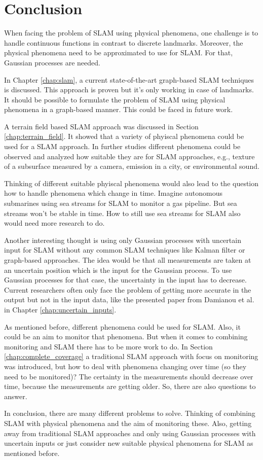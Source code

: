 \section{Conclusion}
When facing the problem of SLAM using physical phenomena, one challenge is
to handle continuous functions in contrast to discrete landmarks. Moreover,
the physical phenomena need to be approximated to use for SLAM. 
For that, Gaussian processes are needed.

In Chapter \ref{chap:slam}, a current state-of-the-art graph-based SLAM
techniques is discussed. This approach is proven but it's only working
in case of landmarks. It should be possible to formulate the problem
of SLAM using physical phenomena in a graph-based manner. This could
be faced in future work.

A terrain field based SLAM approach was discussed in Section \ref{chap:terrain_field}.
It showed that a variety of phyiscal phenomena could be used for a SLAM approach.
In further studies different phenomena could be observed and analyzed how suitable
they are for SLAM approaches, e.g., texture of a subsurface measured by a camera,
emission in a city, or environmental sound.

Thinking of different suitable phyiscal phenomena would also lead to the question
how to handle phenomena which change in time. Imagine autonomous submarines using
sea streams for SLAM to monitor a gas pipeline. But sea streams won't be stable
in time. How to still use sea streams for SLAM also would need more research to do.

Another interesting thought is using only Gaussian processes with uncertain input
for SLAM without any common SLAM techniques like Kalman filter or graph-based 
approaches. The idea would be that all measurements are taken at an uncertain
position which is the input for the Gaussian process. To use Gaussian processes
for that case, the uncertainty in the input has to decrease. Current researchers
often only face the problem of getting more accurate in the output but not in the
input data, like the presented paper from Damianou et al. in Chapter 
\ref{chap:uncertain_inputs}.

As mentioned before, different phenomena could be used for SLAM. Also, it could 
be an aim to monitor that phenomena. But when it comes to combining monitoring
and SLAM there has to be more work to do. In Section \ref{chap:complete_coverage} a
traditional SLAM approach with focus on monitoring was introduced, but how to
deal with phenomena changing over time (so they need to be monitored)? The certainty 
in the measurements should decrease over time, because the measurements are getting older. 
So, there are also questions to answer.

In conclusion, there are many different problems to solve. Thinking of combining
SLAM with physical phenomena and the aim of monitoring these. Also, getting away
from traditional SLAM approaches and only using Gaussian processes with uncertain
inputs or just consider new suitable physical phenomena for SLAM as mentioned before.